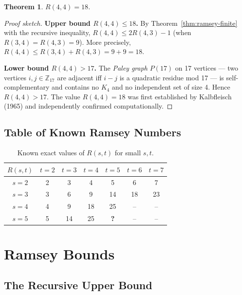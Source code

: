 \documentclass[12pt,a4paper]{amsart}
\newtheorem{theorem}{Theorem}[section]
\theoremstyle{definition}
\theoremstyle{remark}
\begin{document}
\begin{theorem}\label{thm:r44}
$R(4,4) = 18$.
\end{theorem}

\begin{proof}[Proof sketch]
\textbf{Upper bound $R(4,4) \le 18$.}
By Theorem~\ref{thm:ramsey-finite} with the recursive inequality,
$R(4,4) \le 2R(4,3) - 1$ (when $R(3,4) = R(4,3) = 9$).
More precisely, $R(4,4) \le R(3,4) + R(4,3) = 9 + 9 = 18$.

\textbf{Lower bound $R(4,4) > 17$.}
The \emph{Paley graph} $P(17)$ on 17 vertices — two vertices $i,j \in \mathbb{Z}_{17}$
are adjacent iff $i-j$ is a quadratic residue mod 17 — is self-complementary and
contains no $K_4$ and no independent set of size 4.  Hence $R(4,4) > 17$.
The value $R(4,4) = 18$ was first established by Kalbfleisch (1965) and
independently confirmed computationally.
\end{proof}

\subsection{Table of Known Ramsey Numbers}

\begin{table}[h]
\centering
\caption{Known exact values of $R(s,t)$ for small $s,t$.}
\begin{tabular}{@{}ccccccc@{}}
\toprule
$R(s,t)$ & $t=2$ & $t=3$ & $t=4$ & $t=5$ & $t=6$ & $t=7$ \\
\midrule
$s=2$ & 2 & 3 & 4 & 5 & 6 & 7 \\
$s=3$ & 3 & 6 & 9 & 14 & 18 & 23 \\
$s=4$ & 4 & 9 & 18 & 25 & -- & -- \\
$s=5$ & 5 & 14 & 25 & \textbf{?} & -- & -- \\
\bottomrule
\end{tabular}
\label{tab:ramsey}
\end{table}

\section{Ramsey Bounds}

\subsection{The Recursive Upper Bound}
\end{document}
